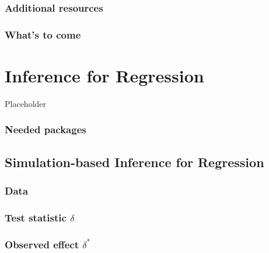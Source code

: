 \documentclass[
  12pt, krantz2,
]{krantz}
\begin{document}
\hypertarget{additional-resources-7}{%
\subsection{Additional resources}\label{additional-resources-7}}

\hypertarget{whats-to-come-8}{%
\subsection{What's to come}\label{whats-to-come-8}}

\hypertarget{inference-for-regression}{%
\chapter{Inference for Regression}\label{inference-for-regression}}

Placeholder

\hypertarget{needed-packages-8}{%
\subsection*{Needed packages}\label{needed-packages-8}}


\hypertarget{simulation-based-inference-for-regression}{%
\section{Simulation-based Inference for Regression}\label{simulation-based-inference-for-regression}}

\hypertarget{data-1}{%
\subsection{Data}\label{data-1}}

\hypertarget{test-statistic-delta-1}{%
\subsection{\texorpdfstring{Test statistic \(\delta\)}{Test statistic \textbackslash delta}}\label{test-statistic-delta-1}}

\hypertarget{observed-effect-delta-1}{%
\subsection{\texorpdfstring{Observed effect \(\delta^*\)}{Observed effect \textbackslash delta\^{}*}}\label{observed-effect-delta-1}}
\end{document}
